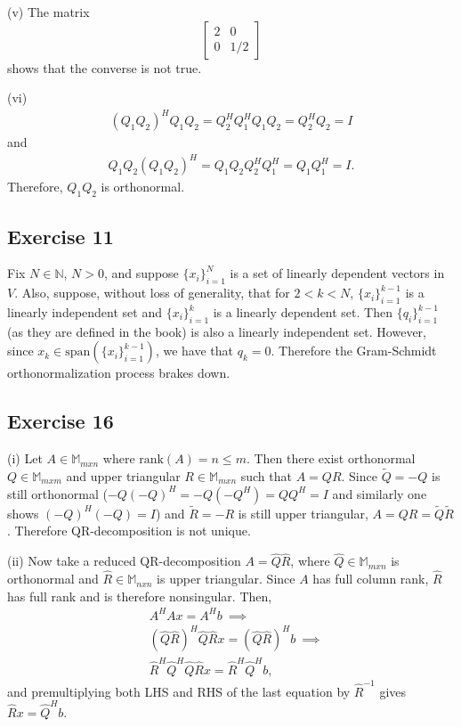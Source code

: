 \documentclass[11.5pt, letterpaper, bibtotoc,
    tablecaptionabove, figurecaptionabove]{article}
\begin{document}
(v)
The matrix
\[\begin{bmatrix}
    2 & 0\\
    0 & 1/2
\end{bmatrix}\]
shows that the converse is not true.

(vi)
\begin{align*}
    (Q_1Q_2)^HQ_1Q_2=Q_2^HQ_1^HQ_1Q_2=Q_2^HQ_2=I
\end{align*}
and
\begin{align*}
     Q_1Q_2(Q_1Q_2)^H=Q_1Q_2Q_2^HQ_1^H=Q_1Q_1^H=I.
\end{align*}
Therefore, $Q_1Q_2$ is orthonormal.

\subsection*{Exercise 11}
Fix $N\in\mathbb N$, $N>0$, and suppose $\{x_i\}_{i=1}^N$ is a set of
linearly dependent vectors in $V$.
Also, suppose, without loss of generality, that for $2<k<N$,
$\{x_i\}_{i=1}^{k-1}$ is a linearly independent set and $\{x_i\}_{i=1}^k$ is a linearly dependent set.
Then $\{q_i\}_{i=1}^{k-1}$ (as they are defined in the book) is also a linearly independent set.
However, since $x_k\in\text{span}(\{x_i\}_{i=1}^{k-1})$, we have that $q_k=0$.
Therefore the Gram-Schmidt orthonormalization process brakes down.

\subsection*{Exercise 16}
(i)
Let $A\in\mathbb M_{mxn}$ where $\text{rank}(A)=n\leq m$.
Then there exist orthonormal $Q\in\mathbb M_{mxm}$ and
upper triangular $R\in\mathbb M_{mxn}$ such that $A=QR$.
Since $\tilde{Q}=-Q$ is still orthonormal ($-Q(-Q)^H=-Q(-Q^H)=QQ^H=I$ 
and similarly one shows $(-Q)^H(-Q)=I$)
and $\tilde{R}=-R$ is still upper triangular, 
$A=QR=\tilde{Q}\tilde{R}$.
Therefore QR-decomposition is not unique.

(ii)
Now take a reduced QR-decomposition $A=\hat{Q}\hat{R}$,
where $\hat{Q}\in\mathbb M_{mxn}$ is orthonormal and $\hat{R}\in\mathbb M_{nxn}$ is upper triangular.
Since $A$ has full column rank, $\hat{R}$ has full rank and is therefore nonsingular.
Then,
\begin{align*}
    &A^HAx=A^Hb\ \implies\\ 
    &(\hat{Q}\hat{R})^H\hat{Q}\hat{R}x = (\hat{Q}\hat{R})^Hb\ \implies\\
    &\hat{R}^H\hat{Q}^H\hat{Q}\hat{R}x = \hat{R}^H\hat{Q}^Hb,
\end{align*}
and premultiplying both LHS and RHS of the last equation by $\hat{R}^{-1}$ gives
$\hat{R}x = \hat{Q}^Hb$.
\end{document}
